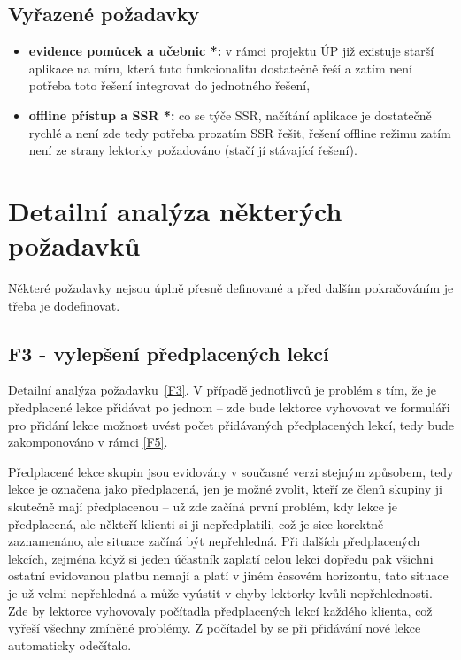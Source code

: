 \subsection{Vyřazené požadavky}\label{subsec:vyrazenepozadavky}
\begin{itemize}
    \item \textbf{evidence pomůcek a učebnic *:} v rámci projektu ÚP již existuje starší aplikace na míru, která tuto funkcionalitu dostatečně řeší a zatím není potřeba toto řešení integrovat do jednotného řešení,
    \item \textbf{offline přístup a SSR *:} co se týče SSR, načítání aplikace je dostatečně rychlé a není zde tedy potřeba prozatím SSR řešit, řešení offline režimu zatím není ze strany lektorky požadováno (stačí jí stávající řešení).
\end{itemize}

\section{Detailní analýza některých požadavků}

Některé požadavky nejsou úplně přesně definované a před dalším pokračováním je třeba je dodefinovat.

\subsection{F3 - vylepšení předplacených lekcí}

Detailní analýza požadavku~\ref{F3}.
V případě jednotlivců je problém s tím, že je předplacené lekce přidávat po jednom -- zde bude lektorce vyhovovat ve formuláři pro přidání lekce možnost uvést počet přidávaných předplacených lekcí, tedy bude zakomponováno v rámci \ref{F5}.

Předplacené lekce skupin jsou evidovány v současné verzi stejným způsobem, tedy lekce je označena jako předplacená, jen je možné zvolit, kteří ze členů skupiny ji skutečně mají předplacenou -- už zde začíná první problém, kdy lekce je předplacená, ale někteří klienti si ji nepředplatili, což je sice korektně zaznamenáno, ale situace začíná být nepřehledná. Při dalších předplacených lekcích, zejména když si jeden účastník zaplatí celou lekci dopředu pak všichni ostatní evidovanou platbu nemají a platí v jiném časovém horizontu, tato situace je už velmi nepřehledná a může vyústit v chyby lektorky kvůli nepřehlednosti. Zde by lektorce vyhovovaly počítadla předplacených lekcí každého klienta, což vyřeší všechny zmíněné problémy. Z počítadel by se při přidávání nové lekce automaticky odečítalo.


